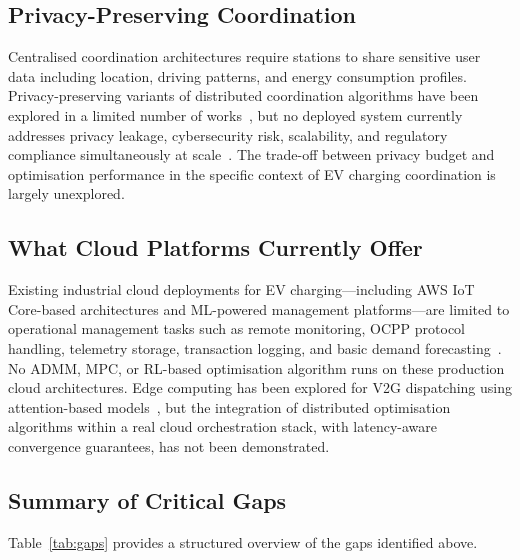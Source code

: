 \documentclass[review]{elsarticle}
\begin{document}
\subsection{Privacy-Preserving Coordination}

Centralised coordination architectures require stations to share 
sensitive user data including location, driving patterns, and 
energy consumption profiles. Privacy-preserving variants of 
distributed coordination algorithms have been explored in a limited 
number of works~\cite{aravena2021decentralized, chowdhury2025secure}, 
but no deployed system currently addresses privacy leakage, 
cybersecurity risk, scalability, and regulatory compliance 
simultaneously at scale~\cite{sadeghian2022comprehensive, 
motlagh2025applied}. The trade-off between privacy budget and 
optimisation performance in the specific context of EV charging 
coordination is largely unexplored.

\subsection{What Cloud Platforms Currently Offer}

Existing industrial cloud deployments for EV charging---including 
AWS IoT Core-based architectures and ML-powered management 
platforms---are limited to operational management tasks such as 
remote monitoring, OCPP protocol handling, telemetry storage, 
transaction logging, and basic demand 
forecasting~\cite{shang2022achieving, sepehrzad2024applied}. 
No ADMM, MPC, or RL-based optimisation algorithm runs on these 
production cloud architectures. Edge computing has been explored 
for V2G dispatching using attention-based 
models~\cite{shang2022achieving}, but the integration of 
distributed optimisation algorithms within a real cloud 
orchestration stack, with latency-aware convergence guarantees, 
has not been demonstrated.

\subsection{Summary of Critical Gaps}

Table~\ref{tab:gaps} provides a structured overview of the gaps 
identified above.
\end{document}
